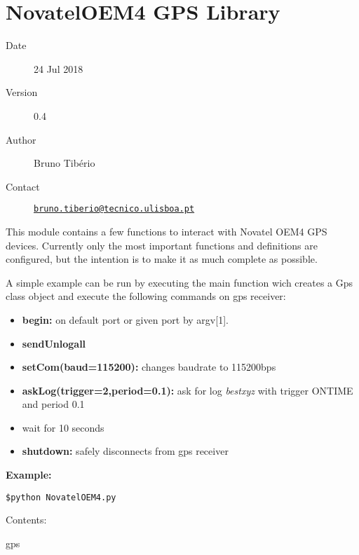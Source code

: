 \providecommand{\tightlist}{%
	\setlength{\itemsep}{0pt}\setlength{\parskip}{0pt}}

\chapter{NovatelOEM4 GPS Library}\label{welcome-to-novateloem4-gps-librarys-documentation}

\begin{description}
\item[Date]
24 Jul 2018
\item[Version]
0.4
\item[Author]
Bruno Tibério
\item[Contact]
\href{mailto:bruno.tiberio@tecnico.ulisboa.pt}{\nolinkurl{bruno.tiberio@tecnico.ulisboa.pt}}
\end{description}

This module contains a few functions to interact with Novatel OEM4 GPS
devices. Currently only the most important functions and definitions are
configured, but the intention is to make it as much complete as
possible.

A simple example can be run by executing the main function wich creates
a Gps class object and execute the following commands on gps receiver:

\begin{itemize}
\tightlist
\item
  \textbf{begin:} on default port or given port by argv{[}1{]}.
\item
  \textbf{sendUnlogall}
\item
  \textbf{setCom(baud=115200):} changes baudrate to 115200bps
\item
  \textbf{askLog(trigger=2,period=0.1):} ask for log \emph{bestxyz} with
  trigger {ONTIME} and period {0.1}
\item
  wait for 10 seconds
\item
  \textbf{shutdown:} safely disconnects from gps receiver
\end{itemize}

\textbf{Example:}

\begin{verbatim}
$python NovatelOEM4.py
\end{verbatim}

Contents:

gps
